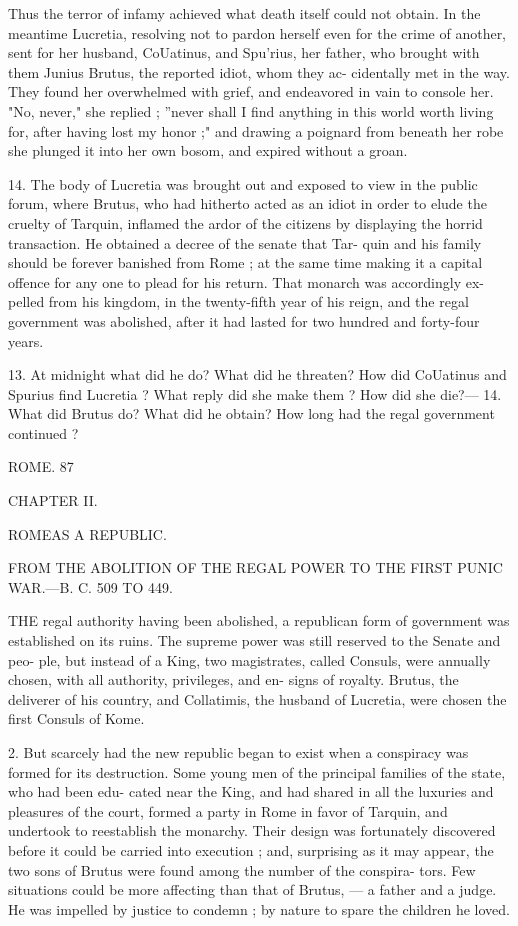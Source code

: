 \documentclass[openany,a4paper]{memoir}
\begin{document}
{Thus the terror of infamy achieved what death itself could 
not obtain. In the meantime Lucretia, resolving not to 
pardon herself even for the crime of another, sent for her 
husband, CoUatinus, and Spu'rius, her father, who brought 
with them Junius Brutus, the reported idiot, whom they ac- 
cidentally met in the way. They found her overwhelmed 
with grief, and endeavored in vain to console her. "No, 
never," she replied ; ''never shall I find anything in this 
world worth living for, after having lost my honor ;" and 
drawing a poignard from beneath her robe she plunged it 
into her own bosom, and expired without a groan. 

14. The body of Lucretia was brought out and exposed to 
view in the public forum, where Brutus, who had hitherto 
acted as an idiot in order to elude the cruelty of Tarquin, 
inflamed the ardor of the citizens by displaying the horrid 
transaction. He obtained a decree of the senate that Tar- 
quin and his family should be forever banished from Rome ; 
at the same time making it a capital offence for any one to 
plead for his return. That monarch was accordingly ex- 
pelled from his kingdom, in the twenty-fifth year of his reign, 
and the regal government was abolished, after it had lasted 
for two hundred and forty-four years. 

13. At midnight what did he do? What did he threaten? How did 
CoUatinus and Spurius find Lucretia ? What reply did she make them ? 
How did she die?— 14. What did Brutus do? What did he obtain? 
How long had the regal government continued ? 



ROME. 87 



CHAPTER II. 

ROMEAS A REPUBLIC. 

FROM THE ABOLITION OF THE REGAL POWER TO THE 
FIRST PUNIC WAR.—B. C. 509 TO 449. 

THE regal authority having been abolished, a republican 
form of government was established on its ruins. The 
supreme power was still reserved to the Senate and peo- 
ple, but instead of a King, two magistrates, called Consuls, 
were annually chosen, with all authority, privileges, and en- 
signs of royalty. Brutus, the deliverer of his country, and 
Collatimis, the husband of Lucretia, were chosen the first 
Consuls of Kome. 

2. But scarcely had the new republic began to exist when 
a conspiracy was formed for its destruction. Some young 
men of the principal families of the state, who had been edu- 
cated near the King, and had shared in all the luxuries and 
pleasures of the court, formed a party in Rome in favor of 
Tarquin, and undertook to reestablish the monarchy. Their 
design was fortunately discovered before it could be carried 
into execution ; and, surprising as it may appear, the two 
sons of Brutus were found among the number of the conspira- 
tors. Few situations could be more affecting than that of 
Brutus, — a father and a judge. He was impelled by justice 
to condemn ; by nature to spare the children he loved. 

}
\end{document}

